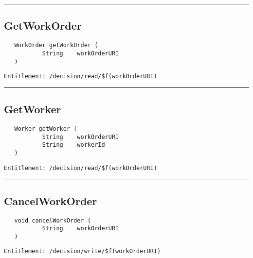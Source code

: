 \rule{12cm}{2pt}
\subsection{GetWorkOrder}
\label{Api:GetWorkOrder}
\begin{Verbatim}
   WorkOrder getWorkOrder (
           String    workOrderURI
   )
\end{Verbatim}
\begin{Verbatim}[formatcom=\color{Maroon}]
  Entitlement: /decision/read/$f(workOrderURI)
\end{Verbatim}



\rule{12cm}{2pt}
\subsection{GetWorker}
\label{Api:GetWorker}
\begin{Verbatim}
   Worker getWorker (
           String    workOrderURI
           String    workerId
   )
\end{Verbatim}
\begin{Verbatim}[formatcom=\color{Maroon}]
  Entitlement: /decision/read/$f(workOrderURI)
\end{Verbatim}



\rule{12cm}{2pt}
\subsection{CancelWorkOrder}
\label{Api:CancelWorkOrder}
\begin{Verbatim}
   void cancelWorkOrder (
           String    workOrderURI
   )
\end{Verbatim}
\begin{Verbatim}[formatcom=\color{Maroon}]
  Entitlement: /decision/write/$f(workOrderURI)
\end{Verbatim}



